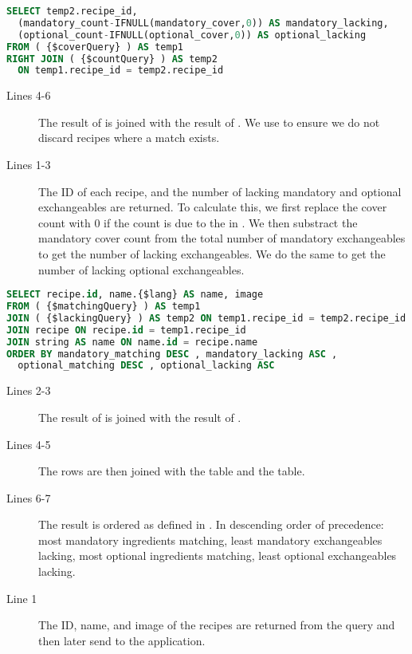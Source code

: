 \begin{lstlisting}[language=SQL, morekeywords={IFNULL}, float=h, label={}, caption={\$lackingQuery, get the lacking ingredients count.}]
SELECT temp2.recipe_id,
  (mandatory_count-IFNULL(mandatory_cover,0)) AS mandatory_lacking,
  (optional_count-IFNULL(optional_cover,0)) AS optional_lacking
FROM ( {$coverQuery} ) AS temp1
RIGHT JOIN ( {$countQuery} ) AS temp2
  ON temp1.recipe_id = temp2.recipe_id
\end{lstlisting}

\begin{description}
\item[Lines 4-6] The result of  is joined with the result of . We use  to ensure we do not discard recipes where a match exists. 
\item[Lines 1-3] The ID of each recipe, and the number of lacking mandatory and optional exchangeables are returned. To calculate this, we first replace the cover count with 0 if the count is  due to the  in . We then substract the mandatory cover count from the total number of mandatory exchangeables to get the number of lacking exchangeables. We do the same to get the number of lacking optional exchangeables.
\end{description}



\begin{lstlisting}[language=SQL, float=h, label={}, caption={\$sortingQuery, combine and sort.}]
SELECT recipe.id, name.{$lang} AS name, image
FROM ( {$matchingQuery} ) AS temp1
JOIN ( {$lackingQuery} ) AS temp2 ON temp1.recipe_id = temp2.recipe_id
JOIN recipe ON recipe.id = temp1.recipe_id
JOIN string AS name ON name.id = recipe.name
ORDER BY mandatory_matching DESC , mandatory_lacking ASC ,
  optional_matching DESC , optional_lacking ASC
\end{lstlisting}

\begin{description}
\item[Lines 2-3] The result of  is joined with the result of .
\item[Lines 4-5] The rows are then joined with the  table and the  table. 
\item[Lines 6-7] The result is ordered as defined in . In descending order of precedence: most mandatory ingredients matching, least mandatory exchangeables lacking, most optional ingredients matching, least optional exchangeables lacking.
\item[Line 1] The ID, name, and image of the recipes are returned from the query and then later send to the application.
\end{description}










